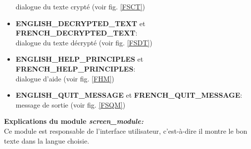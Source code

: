 \documentclass[a4paper,12pt,abstracton,titlepage]{scrartcl}
\begin{document}
\begin{itemize}
dialogue du texte crypté (voir fig. \ref{FSCT})\\
\item \textbf{ENGLISH\_DECRYPTED\_TEXT} et \textbf{FRENCH\_DECRYPTED\_TEXT}:\\
dialogue du texte décrypté (voir fig. \ref{FSDT})\\
\item \textbf{ENGLISH\_HELP\_PRINCIPLES} et \textbf{FRENCH\_HELP\_PRINCIPLES}:\\
dialogue d'aide (voir fig. \ref{FHM})\\
\item \textbf{ENGLISH\_QUIT\_MESSAGE} et \textbf{FRENCH\_QUIT\_MESSAGE}:\\
message de sortie (voir fig. \ref{FSQM})\\
\end{itemize}
\vspace{0.5cm}


\newpage
\textbf{Explications du module \textit{screen\_module:}}\\
Ce module est responsable de l'interface utilisateur, c'est-à-dire il montre le bon texte dans la langue choisie.
\vspace{0.3cm}
\end{document}
